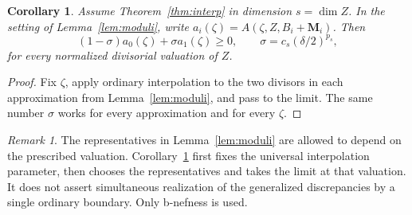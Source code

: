 \documentclass[11pt,reqno]{amsart}
\numberwithin{equation}{section}
\newtheorem{corollary}[theorem]{Corollary}
\theoremstyle{definition}
\theoremstyle{remark}
\newtheorem{remark}[theorem]{Remark}
\newcommand{\bM}{\mathbf M}
\begin{document}
\begin{corollary}\label{cor:generalized}
Assume Theorem~\ref{thm:interp} in dimension $s=\dim Z$. In the setting of Lemma~\ref{lem:moduli}, write $a_i(\zeta)=A(\zeta,Z,B_i+\bM_i)$. Then
\begin{equation}\label{eq:geninterp}
 (1-\sigma)a_0(\zeta)+\sigma a_1(\zeta)\ge0,
 \qquad \sigma=c_s(\delta/2)^{p_s},
\end{equation}
for every normalized divisorial valuation of $Z$.
\end{corollary}
\begin{proof}
Fix $\zeta$, apply ordinary interpolation to the two divisors in each approximation from Lemma~\ref{lem:moduli}, and pass to the limit. The same number $\sigma$ works for every approximation and for every $\zeta$.
\end{proof}

\begin{remark}
The representatives in Lemma~\ref{lem:moduli} are allowed to depend on the prescribed valuation. Corollary~\ref{cor:generalized} first fixes the universal interpolation parameter, then chooses the representatives and takes the limit at that valuation. It does not assert simultaneous realization of the generalized discrepancies by a single ordinary boundary. Only b-nefness is used.
\end{remark}
\end{document}
